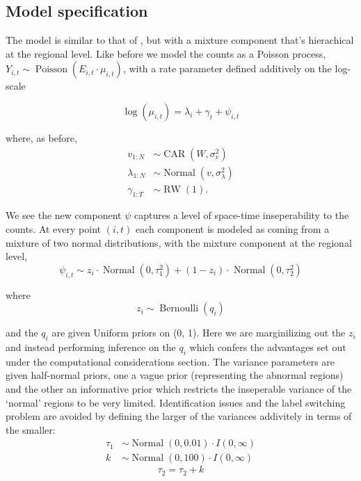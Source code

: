 \documentclass{report}
\begin{document}
\subsection{Model specification}

The model is similar to that of \cite{stability}, but with a mixture component that's hierachical at the regional level. Like before we model the counts as a Poisson process, $Y_{i,t} \sim \operatorname{Poisson}(E_{i,t} \cdot \mu_{i,t})$, with a rate parameter defined additively on the log-scale

\begin{equation}
\log(\mu_{i,t}) = \lambda_i + \gamma_t + \psi_{i,t}
\end{equation}

where, as before,
\begin{align}
v_{1:N} &\sim \operatorname{CAR}(W, \sigma_v^2) \\
\lambda_{1:N} &\sim \operatorname{Normal}(v, \sigma_\lambda^2) \\
\gamma_{1:T} &\sim \operatorname{RW}(1).
\end{align}

We see the new component $\psi$ captures a level of space-time inseperability to the counts. At every point $(i, t)$ each component is modeled as coming from a mixture of two normal distributions, with the mixture component at the regional level,
\begin{equation}
\psi_{i,t} \sim z_i \cdot \operatorname{Normal}(0, \tau_1^2) + (1 - z_i) \cdot \operatorname{Normal}(0, \tau_2^2)
\end{equation} 

where
\begin{equation}
  z_i \sim \operatorname{Bernoulli}(q_i)
\end{equation}

and the $q_i$ are given Uniform priors on (0, 1). Here we are marginilizing out the $z_i$ and instead performing inference on the $q_i$ which confers the advantages set out under the computational considerations section. The variance parameters are given half-normal priors, one a vague prior (representing the abnormal regions) and the other an informative prior which restricts the inseperable variance of the `normal' regions to be very limited. Identification issues and the label switching problem are avoided by defining the larger of the variances addivitely in terms of the smaller:
\begin{align}
  \tau_1 &\sim \operatorname{Normal}(0, 0.01) \cdot I(0, \infty) \\
  k &\sim \operatorname{Normal}(0, 100) \cdot I(0, \infty)
\end{align}
\begin{equation}
 \tau_2 = \tau_2 + k
\end{equation}
\end{document}

